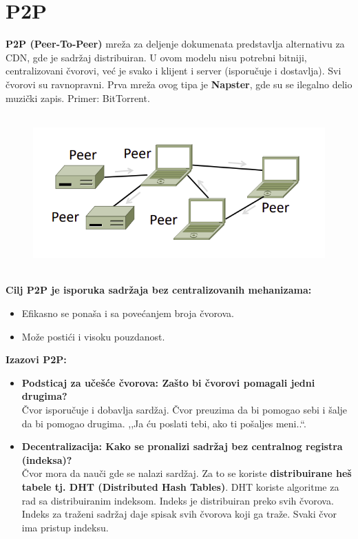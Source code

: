\documentclass[a4paper]{article}
\begin{document}
\section{P2P}
    \textbf{P2P (Peer-To-Peer)} mreža za deljenje dokumenata predstavlja alternativu za CDN,
    gde je sadržaj distribuiran. U ovom modelu nisu potrebni bitniji, centralizovani čvorovi,
    već je svako i klijent i server (isporučuje i dostavlja). Svi čvorovi su ravnopravni.
    Prva mreža ovog tipa je \textbf{Napster}, gde su se ilegalno delio muzički zapis. 
    Primer: BitTorrent.
    \begin{figure}[H]
        \begin{center}
            \includegraphics[width=120mm,height=60mm]{Slike/p2p1.png}
        \end{center}
    \end{figure}
    \textbf{Cilj P2P je isporuka sadržaja bez centralizovanih mehanizama:}
    \begin{itemize}
        \item Efikasno se ponaša i sa povećanjem broja čvorova.
        \item Može postići i visoku pouzdanost.
    \end{itemize}
    \textbf{Izazovi P2P:}
    \begin{itemize}
        \item \textbf{Podsticaj za učešće čvorova: Zašto bi čvorovi pomagali jedni drugima?}\\
              Čvor isporučuje i dobavlja sardžaj. Čvor preuzima da bi pomogao sebi i šalje
              da bi pomogao drugima. ,,Ja ću poslati tebi, ako ti pošaljes meni..``.
        \item \textbf{Decentralizacija: Kako se pronalizi sadržaj bez centralnog registra (indeksa)?}\\
              Čvor mora da nauči gde se nalazi sardžaj. Za to se koriste \textbf{distribuirane heš
              tabele tj. DHT (Distributed Hash Tables)}. DHT koriste algoritme za rad sa distribuiranim
              indeksom. Indeks je distribuiran preko svih čvorova. Indeks za traženi sadržaj daje
              spisak svih čvorova koji ga traže. Svaki čvor ima pristup indeksu.
    \end{itemize}
\end{document}
